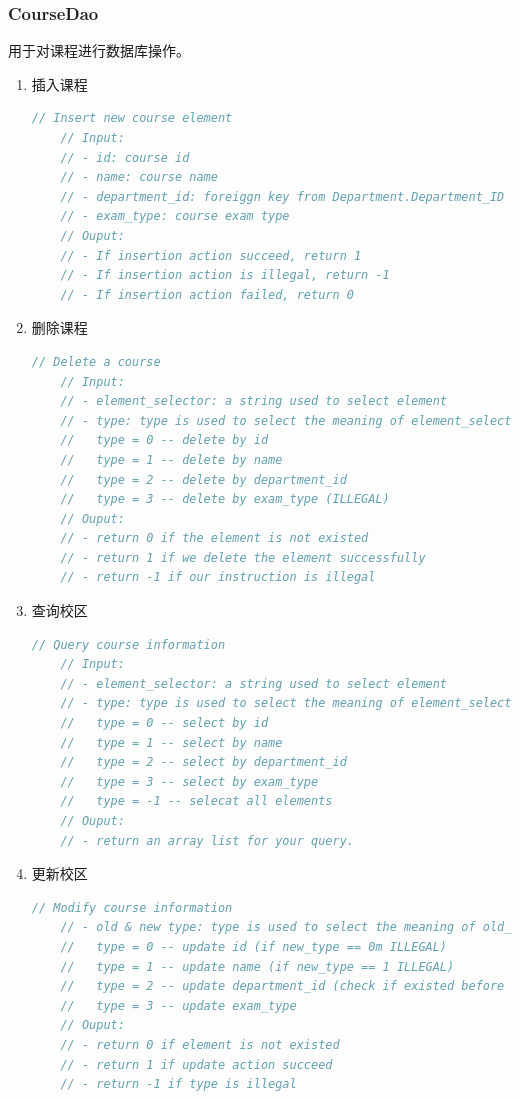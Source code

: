 \documentclass[../report.tex]{subfiles}
\begin{document}
\subsubsection{CourseDao}
用于对课程进行数据库操作。
\begin{enumerate}
\itemsep 0em
\item 插入课程\\
\begin{lstlisting}[language=java,backgroundcolor=\color{lightgray}]
    // Insert new course element
    // Input:
    // - id: course id
    // - name: course name
    // - department_id: foreiggn key from Department.Department_ID
    // - exam_type: course exam type
    // Ouput:
    // - If insertion action succeed, return 1
    // - If insertion action is illegal, return -1
    // - If insertion action failed, return 0
\end{lstlisting}
\item 删除课程\\
\begin{lstlisting}[language=java,backgroundcolor=\color{lightgray}]
    // Delete a course
    // Input:
    // - element_selector: a string used to select element
    // - type: type is used to select the meaning of element_selector
    //   type = 0 -- delete by id
    //   type = 1 -- delete by name
    //   type = 2 -- delete by department_id
    //   type = 3 -- delete by exam_type (ILLEGAL)
    // Ouput:
    // - return 0 if the element is not existed
    // - return 1 if we delete the element successfully
    // - return -1 if our instruction is illegal
\end{lstlisting}
\item 查询校区\\
\begin{lstlisting}[language=java,backgroundcolor=\color{lightgray}]
    // Query course information
    // Input:
    // - element_selector: a string used to select element
    // - type: type is used to select the meaning of element_selector
    //   type = 0 -- select by id
    //   type = 1 -- select by name
    //   type = 2 -- select by department_id
    //   type = 3 -- select by exam_type
    //   type = -1 -- selecat all elements
    // Ouput:
    // - return an array list for your query.
\end{lstlisting}
\item 更新校区\\
\begin{lstlisting}[language=java,backgroundcolor=\color{lightgray}]
    // Modify course information
    // - old & new type: type is used to select the meaning of old_value & new_value
    //   type = 0 -- update id (if new_type == 0m ILLEGAL)
    //   type = 1 -- update name (if new_type == 1 ILLEGAL)
    //   type = 2 -- update department_id (check if existed before update)
    //   type = 3 -- update exam_type
    // Ouput:
    // - return 0 if element is not existed
    // - return 1 if update action succeed
    // - return -1 if type is illegal
\end{lstlisting}
\end{enumerate}
\end{document}
